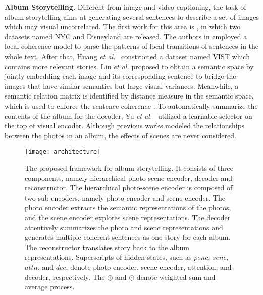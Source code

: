 \documentclass[letterpaper]{article} \usepackage{aaai19}  \usepackage{times}  \usepackage{helvet}  \usepackage{courier}  \usepackage{url}  \usepackage{graphicx}  \usepackage{color}
\begin{document}
\textbf{Album Storytelling.} Different from image and video captioning, the task of album storytelling aims at generating several sentences to describe a set of images which may visual uncorrelated. The first work for this area is \cite{park2015expressing}, in which two datasets named NYC and Disneyland are released. The authors in \cite{park2015expressing} employed a local coherence model \cite{barzilay2008modeling} to parse the patterns of local transitions of sentences in the whole text. After that, Huang \textit{et al.}~\cite{huang2016visual} constructed a dataset named VIST which contains more relevant stories. Liu \textit{et al.} proposed to obtain a semantic space by jointly embedding each image and its corresponding sentence to bridge the images that have similar semantics but large visual variances. Meanwhile, a semantic relation matrix is identified by distance measure in the semantic space, which is used to enforce the sentence coherence \cite{liu2017let}. To automatically summarize the contents of the album for the decoder, Yu \textit{et al.}~\cite{yu2017hierarchically} utilized a learnable selector on the top of visual encoder. Although previous works modeled the relationships between the photos in an album, the effects of scenes are never considered.


\begin{figure*}
\centering
\texttt{[image: architecture]}
\caption{The proposed framework for album storytelling. It consists of three components, namely hierarchical photo-scene encoder, decoder and reconstructor. The hierarchical photo-scene encoder is composed of two sub-encoders, namely photo encoder and scene encoder. The  photo encoder extracts the semantic representations of the photos, and the scene encoder explores scene representations.
The decoder attentively summarizes the photo and scene representations and generates multiple coherent sentences as one story for each album. The reconstructor translates story back to the album representations.
Superscripts of hidden states, such as $penc$, $senc$, $attn$, and $dec$, denote photo encoder, scene encoder, attention, and decoder, respectively.
The $\oplus$ and $\odot$ denote weighted sum and average process.}
\label{fig:architecture}
\end{figure*}
\end{document}
